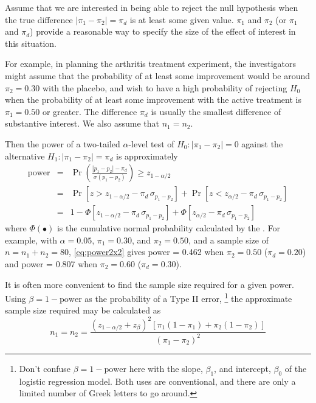 Assume that we are interested in being able to reject the null
hypothesis when the true difference  $|\pi_1 - \pi_2| = \pi_d$ is at least
some given value.  $\pi_1$ and $\pi_2$ (or $\pi_1$ and $\pi_d$)
provide a reasonable way to
specify the size of the effect of interest in this situation.

For example, in planning the arthritis treatment
experiment, the investigators might assume that
the probability of at least some improvement would be around $\pi_2 = 0.30$
with the placebo, and wish to have a high probability of rejecting
$H_0$ when the probability of at least some improvement with the active
treatment                                                                                                                                                     
is $\pi_1 = 0.50$
or greater.  The difference $\pi_d$ is usually the smallest difference
of substantive interest.  We also assume that $n_1 = n_2$.

Then the power of a two-tailed $\alpha$-level test of 
$H_0 : |\pi_1 - \pi_2 | = 0$
against the alternative $H_1: |\pi_1 - \pi_2| = \pi_d$
is approximately
\begin{eqnarray}
\mbox{power} & = & \Pr \left(
 \frac{ | p_1 - p_2 | - \pi_d }{ \sigma ( p_1 - p_2 ) }
 \right) \ge z_{1-\alpha/2} \nonumber \\
 & = & \Pr [ z > z_{1-\alpha /2} - \pi_d \, \sigma_{p_1 - p_2} ]
     + \Pr [ z < z_{\alpha /2} - \pi_d \, \sigma_{p_1 - p_2} ] \nonumber \\
 & = & 1- \Phi [z_{1-\alpha /2} - \pi_d \, \sigma_{p_1 - p_2}]
     + \Phi [z_{\alpha /2} - \pi_d \,  \sigma_{p_1 - p_2}] \label{eq:power2x2}
\end{eqnarray}
where $\Phi(\bullet)$ is the cumulative normal probability calculated by the
.  For example, with $\alpha=0.05$, $\pi_1=0.30$,
and $\pi_2=0.50$, and a sample size of $n = n_1 + n_2 =80$, \eqref{eq:power2x2}
gives power = 0.462 when $\pi_2 = 0.50$ ($\pi_d = 0.20$)
and power =  0.807 when $\pi_2 = 0.60$ ($\pi_d = 0.30$).

It is often more convenient to find the sample size required for a
given power.  Using $\beta = 1- \mbox{power}$ as the probability of
a Type II error,%
\footnote{Don't confuse $\beta = 1- \mbox{power}$ here with the slope, $\beta_1$,
and intercept, $\beta_0$ of the logistic regression model.  Both uses
are conventional, and there are only a limited number of Greek letters
to go around.}
the approximate sample size required may be calculated as
\begin{equation}\label{eq:nbinlog}
n_1 = n_2 = \frac{ (z_{1-\alpha /2} + z_\beta) ^2 [ \pi_1 (1-\pi_1) + \pi_2 (1-\pi_2) ]} { (\pi_1 - \pi_2)^2 }
\end{equation}

